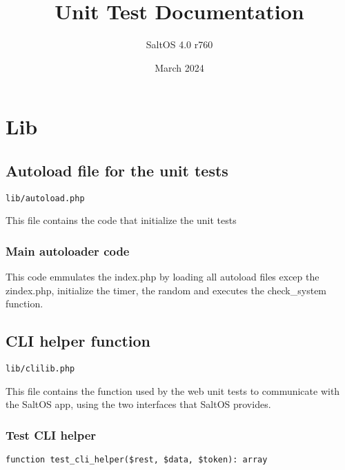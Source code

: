 \documentclass[a4paper]{book}
\title{Unit Test Documentation}
\author{SaltOS 4.0 r760}
\begin{document}
\date{March 2024}
\maketitle
\clearpage

\tableofcontents
\clearpage


\hypertarget{toc1}{}
\chapter{Lib}

\hypertarget{toc2}{}
\section{Autoload file for the unit tests}

\begin{lstlisting}
lib/autoload.php
\end{lstlisting}

This file contains the code that initialize the unit tests

\hypertarget{toc3}{}
\subsection{Main autoloader code}

This code emmulates the index.php by loading all autoload files excep
the zindex.php, initialize the timer, the random and executes the
check\_system function.

\hypertarget{toc4}{}
\section{CLI helper function}

\begin{lstlisting}
lib/clilib.php
\end{lstlisting}

This file contains the function used by the web unit tests to communicate with the
SaltOS app, using the two interfaces that SaltOS provides.

\hypertarget{toc5}{}
\subsection{Test CLI helper}

\begin{lstlisting}
function test_cli_helper($rest, $data, $token): array
\end{lstlisting}
\end{document}
